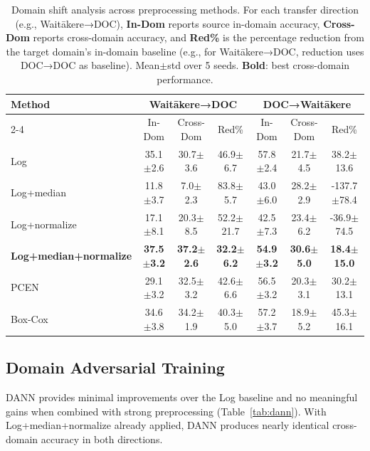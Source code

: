 \documentclass[peer-review]{fa2026}
\begin{document}
\begin{table}[t]
\centering
\small
\caption{Domain shift analysis across preprocessing methods. For each transfer direction (e.g., Wait\=akere→DOC), \textbf{In-Dom} reports source in-domain accuracy, \textbf{Cross-Dom} reports cross-domain accuracy, and \textbf{Red\%} is the percentage reduction from the target domain's in-domain baseline (e.g., for Wait\=akere→DOC, reduction uses DOC→DOC as baseline). Mean$\pm$std over 5 seeds. \textbf{Bold}: best cross-domain performance.}
\label{tab:results}
\begin{tabular}{@{}lcccccc@{}}
\hline
Method & \multicolumn{3}{c}{Wait\=akere→DOC} & \multicolumn{3}{c}{DOC→Wait\=akere} \\
\cline{2-4} \cline{5-7} & In-Dom & Cross-Dom & Red\% & In-Dom & Cross-Dom & Red\% \\
\hline
Log             & 35.1$\pm$2.6 & 30.7$\pm$3.6 & 46.9$\pm$6.7 & 57.8$\pm$2.4 & 21.7$\pm$4.5 & 38.2$\pm$13.6 \\
Log+median      & 11.8$\pm$3.7 & 7.0$\pm$2.3 & 83.8$\pm$5.7 & 43.0$\pm$6.0 & 28.2$\pm$2.9 & -137.7$\pm$78.4 \\
Log+normalize   & 17.1$\pm$8.1 & 20.3$\pm$8.5 & 52.2$\pm$21.7 & 42.5$\pm$7.3 & 23.4$\pm$6.2 & -36.9$\pm$74.5 \\
\textbf{Log+median+normalize}   & \textbf{37.5$\pm$3.2} & \textbf{37.2$\pm$2.6} & \textbf{32.2$\pm$6.2} & \textbf{54.9$\pm$3.2} & \textbf{30.6$\pm$5.0} & \textbf{18.4$\pm$15.0} \\
PCEN              & 29.1$\pm$3.2 & 32.5$\pm$3.2 & 42.6$\pm$6.6 & 56.5$\pm$3.2 & 20.3$\pm$3.1 & 30.2$\pm$13.1 \\
Box-Cox           & 34.6$\pm$3.8 & 34.2$\pm$1.9 & 40.3$\pm$5.0 & 57.2$\pm$3.7 & 18.9$\pm$5.2 & 45.3$\pm$16.1 \\
\hline
\end{tabular}
\end{table}

\subsection{Domain Adversarial Training}

DANN provides minimal improvements over the Log baseline and no meaningful gains when combined with strong preprocessing (Table~\ref{tab:dann}). With Log+median+normalize already applied, DANN produces nearly identical cross-domain accuracy in both directions.
\end{document}
